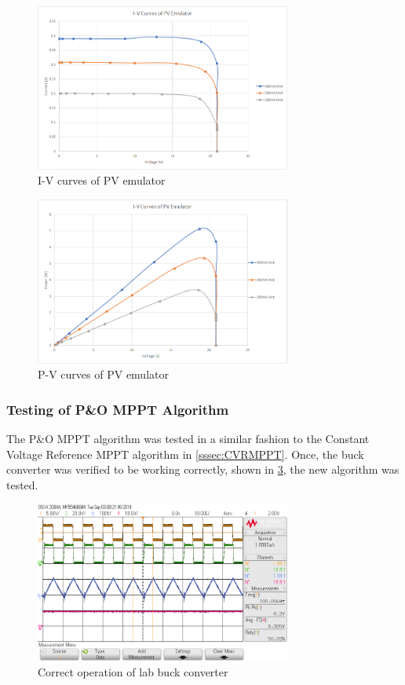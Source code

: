 \documentclass[]{article}
\begin{document}
				\begin{figure}[H]
					\centering
					\includegraphics[width=0.75\textwidth]{Lab4Results/IV_Curve}
					\caption{I-V curves of PV emulator}
					\label{fig:lab4IVCurve}
				\end{figure}
	 			\begin{figure}[H]
	 				\centering
	 				\includegraphics[width=0.75\textwidth]{Lab4Results/PV_Curve}
	 				\caption{P-V curves of PV emulator}
	 				\label{fig:lab4PVCurve}
	 			\end{figure}
 			\subsubsection{Testing of P\&O MPPT Algorithm}
 				The P\&O MPPT algorithm was tested in a similar fashion to the Constant Voltage Reference MPPT algorithm in \cref{sssec:CVRMPPT}. Once, the buck converter was verified to be working correctly, shown in \cref{fig:lab4buck}, the new algorithm was tested.
 				\begin{figure}[H]
 					\centering
 					\includegraphics[width=0.75\textwidth]{Lab4Results/BuckTest_50DutyCycle_100KHz}
 					\caption{Correct operation of lab buck converter}
 					\label{fig:lab4buck}
 				\end{figure}
 				
\end{document}
